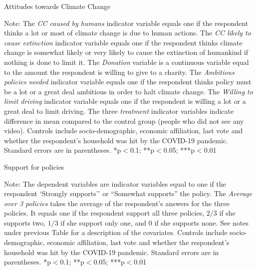 \documentclass[aspectratio=169,9pt,dvipsnames]{beamer}
\begin{document}
\begin{frame}{}%
\begin{table}[h!]
\caption{Attitudes towards Climate Change}
\begin{center}
\scalebox{.59}{}
\end{center}
	{\tiny Note: The \textit{CC caused by humans} indicator variable equals one if the respondent thinks a lot or most of climate change is due to human actions. The \textit{CC likely to cause extinction} indicator variable equals one if the respondent thinks climate change is somewhat likely or very likely to cause the extinction of humankind if nothing is done to limit it. The \textit{Donation} variable is a continuous variable equal to the amount the respondent is willing to give to a charity. The \textit{Ambitious policies needed} indicator variable equals one if the respondent thinks policy must be a lot or a great deal ambitious in order to halt climate change. The \textit{Willing to limit driving} indicator variable equals one if the respondent is willing a lot or a great deal to limit driving. The three \textit{treatment} indicator variables indicate difference in mean compared to the control group (people who did not see any video). Controls include socio-demographic, economic affiliation, last vote and whether the respondent's household was hit by the COVID-19 pandemic. Standard errors are in parentheses.  *p$<$0.1; **p$<$0.05; ***p$<$0.01}
\end{table}
\end{frame}

\begin{frame}{}%
\begin{table}[h!]
\caption{Support for policies}
\begin{center}
\scalebox{.7}{}
\end{center}
	{\footnotesize Note: The dependent variables are indicator variables equal to one if the respondent `Strongly supports'' or ``Somewhat supports'' the policy. The \textit{Average over 3 policies} takes the average of the respondent's answers for the three policies. It equals one if the respondent support all three policies, $2/3$ if she supports two, $1/3$ if she support only one, and 0 if she supports none. See notes under previous Table for a description of the covariates.
	\newline Controls include socio-demographic, economic affiliation, last vote and whether the respondent's household was hit by the COVID-19 pandemic. Standard errors are in parentheses. *p$<$0.1; **p$<$0.05; ***p$<$0.01}
\end{table}
\end{frame}
\end{document}
